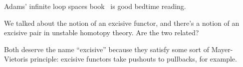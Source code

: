 Adams' infinite loop spaces book~\cite{InfiniteLoopSpaces} is good bedtime reading.
\begin{ques}
We talked about the notion of an excisive functor, and there's a notion of an excisive pair in unstable homotopy
theory. Are the two related?
\end{ques}
Both deserve the name ``excisive'' because they satisfy some sort of Mayer-Vietoris principle: excisive functors
take pushouts to pullbacks, for example.
